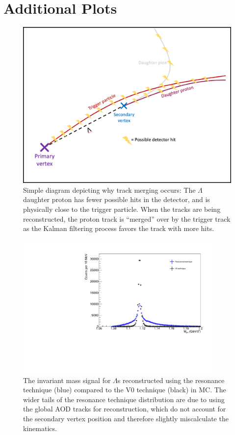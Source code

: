 \documentclass[ALICE,manyauthors]{ALICE_analysis_notes}
\begin{document}
\clearpage

\section {Additional Plots}

\begin{figure}[ht]
\centering
\includegraphics[width=5in]{figures/track_merging_diagram_withborder.pdf}
\caption{Simple diagram depicting why track merging occurs: The $\Lambda$ daughter proton has fewer possible hits in the detector, and is physically close to the trigger particle. When the tracks are being reconstructed, the proton track is ``merged'' over by the trigger track as the Kalman filtering process favors the track with more hits.}
\label{trackmerge_diagram}
\end{figure}

\begin{figure}[ht]
\centering
\includegraphics[width=4in]{figures/lambda_mass_resonance_mc.pdf}
\caption{The invariant mass signal for $\Lambda$s reconstructed using the resonance technique (blue) compared to the V0 technique (black) in MC. The wider tails of the resonance technique distribution are due to using the global AOD tracks for reconstruction, which do not account for the secondary vertex position and therefore slightly miscalculate the kinematics.}
\label{lambda_mass_v0_res_comp}
\end{figure}

\clearpage
\end{document}
